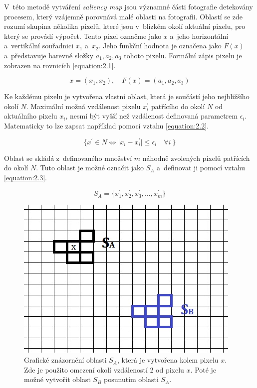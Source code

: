 V~této metodě vytváření \emph{saliency map} jsou významné části fotografie detekovány procesem, který vzájemně porovnává malé oblasti na fotografii. Oblastí se zde rozumí skupina několika pixelů, které jsou v~blízkém okolí aktuální pixelu, pro který se provádí výpočet. Tento pixel označme jako $x$ a~jeho horizontální a~vertikální souřadnici $x_1$ a~$x_2$. Jeho funkční hodnota je označena jako $F(x)$ a~představuje barevné složky $a_1, a_2, a_3$ tohoto pixelu. Formální zápis pixelu je zobrazen na rovnicích \ref{equation:2.1}.

\begin{equation} \label{equation:2.1}
x = (x_1, x_2), \quad F(x) = (a_1, a_2, a_3)
\end{equation}

Ke každému pixelu je vytvořena vlastní oblast, která je součástí jeho nejbližšího okolí $N$. Maximální možná vzdálenost pixelu $x_i^{\prime}$ patřícího do okolí $N$ od aktuálního pixelu $x_i$, nesmí být vyšší než vzdálenost definovaná parametrem $\epsilon_i$. Matematicky to lze zapsat například pomocí vztahu \ref{equation:2.2}.

\begin{equation} \label{equation:2.2}
\{ x^{\prime} \in N \Leftrightarrow \lvert x_i - x_i^{\prime} \rvert \leq \epsilon_i \quad \forall i~\}
\end{equation}

Oblast se skládá z~definovaného množství $m$ náhodně zvolených pixelů patřících do okolí $N$. Tuto oblast je možné označit jako $S_A$ a~definovat ji pomocí vztahu \ref{equation:2.3}.

\begin{equation} \label{equation:2.3}
S_A = \{ x_1^{\prime}, x_2^{\prime}, x_3^{\prime}, \dots, x_m^{\prime} \}
\end{equation}

\begin{figure}[H]
    \centering
    \includegraphics[scale=0.75]{obrazky/forks.jpg}  
    \caption{Grafické znázornění oblasti $S_A$, která je vytvořena kolem pixelu $x$. Zde je použito omezení okolí vzdáleností 2 od pixelu $x$. Poté je možné vytvořit oblast $S_B$ posunutím oblasti $S_A$.}
	\label{obr:forks}
\end{figure}

